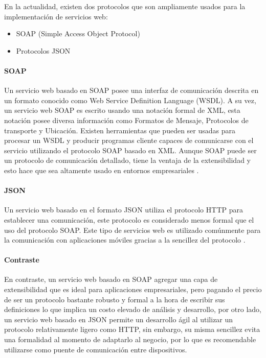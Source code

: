 En la actualidad, existen dos protocolos que son ampliamente usados para la implementación de servicios web:
\begin{itemize}
	\item SOAP (Simple Access Object Protocol)
	\item Protocolos JSON 
\end{itemize}

\paragraph{SOAP}
Un servicio web basado en SOAP posee una interfaz de comunicación descrita en un formato conocido como Web Service Definition Language (WSDL). A su vez, un servicio web SOAP es escrito usando una notación formal de XML, esta notación posee diversa información como Formatos de Mensaje, Protocolos de transporte y Ubicación. Existen herramientas que pueden ser usadas para procesar un WSDL y producir programas cliente capaces de comunicarse con el servicio utilizando el protocolo SOAP basado en XML. Aunque SOAP puede ser un protocolo de comunicación detallado, tiene la ventaja de la extensibilidad y esto hace que sea altamente usado en entornos empresariales \citep{MarcoTeorico11}.

\paragraph{JSON}
Un servicio web basado en el formato JSON utiliza el protocolo HTTP para establecer una comunicación, este protocolo es considerado menos formal que el uso del protocolo SOAP. Este tipo de servicios web es utilizado comúnmente para la comunicación con aplicaciones móviles gracias a la sencillez del protocolo \citep{MarcoTeorico11}.
 
\paragraph{Contraste}En contraste, un servicio web basado en SOAP agregar una capa de extensibilidad que es ideal para aplicaciones empresariales, pero pagando el precio de ser un protocolo bastante robusto y formal a la hora de escribir sus definiciones lo que implica un costo elevado de análisis y desarrollo, por otro lado, un servicio web basado en JSON permite un desarrollo ágil al utilizar un protocolo relativamente ligero como HTTP, sin embargo, su misma sencillez evita una formalidad al momento de adaptarlo al negocio, por lo que es recomendable utilizarse como puente de comunicación entre dispositivos.

